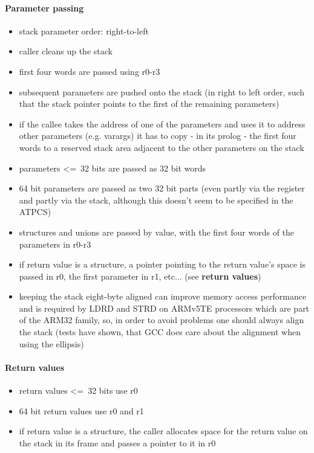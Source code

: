 \paragraph{Parameter passing}

\begin{itemize}
\item stack parameter order: right-to-left
\item caller cleans up the stack
\item first four words are passed using r0-r3
\item subsequent parameters are pushed onto the stack (in right to left order, such that the stack pointer points to the first of the remaining parameters)
\item if the callee takes the address of one of the parameters and uses it to address other parameters (e.g. varargs) it has to copy - in its prolog - the first four words to a reserved stack area adjacent to the other parameters on the stack
\item parameters \textless=\ 32 bits are passed as 32 bit words
\item 64 bit parameters are passed as two 32 bit parts (even partly via the register and partly via the stack, although this doesn't seem to be specified in the ATPCS)
\item structures and unions are passed by value, with the first four words of the parameters in r0-r3
\item if return value is a structure, a pointer pointing to the return value's space is passed in r0, the first parameter in r1, etc... (see {\bf return values})
\item keeping the stack eight-byte aligned can improve memory access performance and is required by LDRD and STRD on ARMv5TE processors which are part of the ARM32 family, so, in order to avoid problems one should always align the stack (tests have shown, that GCC does care about the alignment when using the ellipsis)
\end{itemize}

\paragraph{Return values}
\begin{itemize}
\item return values \textless=\ 32 bits use r0
\item 64 bit return values use r0 and r1
\item if return value is a structure, the caller allocates space for the return value on the stack in its frame and passes a pointer to it in r0
\end{itemize}

